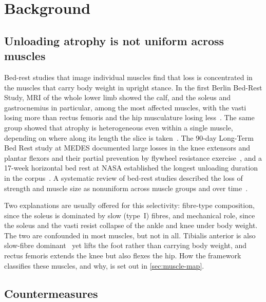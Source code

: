 \section{Background}
\label{sec:background}


\subsection{Unloading atrophy is not uniform across muscles}

Bed-rest studies that image individual muscles find that loss is concentrated in the muscles that carry body
weight in upright stance. In the first Berlin Bed-Rest Study, MRI of the whole lower limb showed the calf, and the
soleus and gastrocnemius in particular, among the most affected muscles, with the vasti losing more than rectus
femoris and the hip musculature losing less~\citep{belavy2009}. The same group showed that atrophy is heterogeneous
even within a single muscle, depending on where along its length the slice is taken~\citep{miokovic2012}. The
90-day Long-Term Bed Rest study at MEDES documented large losses in the knee extensors and plantar flexors and their
partial prevention by flywheel resistance exercise~\citep{alkner2004,belavy2017}, and a 17-week horizontal bed rest
at NASA established the longest unloading duration in the corpus~\citep{leblanc1992}. A systematic review of
bed-rest studies described the loss of strength and muscle size as nonuniform across muscle groups and over
time~\citep{marusic2021}.

Two explanations are usually offered for this selectivity: fibre-type composition, since the soleus is dominated
by slow (type~I) fibres, and mechanical role, since the soleus and the vasti resist collapse of the ankle and knee
under body weight. The two are confounded in most muscles, but not in all. Tibialis anterior is also slow-fibre
dominant~\citep{johnson1973} yet lifts the foot rather than carrying body weight, and rectus femoris extends the
knee but also flexes the hip. How the framework classifies these muscles, and why, is set out in
\cref{sec:muscle-map}.

\subsection{Countermeasures}

